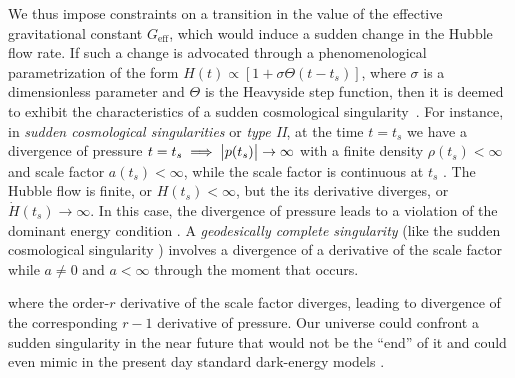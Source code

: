\documentclass[universe,article,accept,moreauthors,pdftex]{Definitions/mdpi}
\begin{document}
We thus impose constraints on a transition in the value of the effective gravitational constant $G_{\text{eff}}$, which would induce a sudden change in the Hubble flow rate. If such a change is advocated through a phenomenological parametrization of the form $H(t)\propto [1+\sigma \Theta(t-t_{s})]$, where $\sigma$ is a dimensionless parameter and $\Theta$ is the Heavyside step function, then it is deemed to exhibit the characteristics of a sudden cosmological \mbox{singularity \cite{Barrow_2004,Barrow:2004he,Fernandez-Jambrina:2006qld,Fernandez-Jambrina:2008pwx,Fernandez-Jambrina:2006tkb,Perivolaropoulos:2016nhp}}. For instance, in \textit{sudden cosmological singularities} or \textit{type II}, at the time $t=t_s$ we have a divergence of pressure $t=t_{s}\implies \big{|}p(t_{s})\big{|}\to \infty$ with a finite density $\rho(t_{s})<\infty$ and scale factor $a(t_{s})<\infty$, while the scale factor is continuous at $t_{s}$ \cite{Barrow_2004,Fernandez-Jambrina:2006qld,Fernandez-Jambrina:2006tkb,amendola_tsujikawa_2010}. The Hubble flow 
 is finite, or $H(t_{s})<\infty$, but the its derivative diverges, %
 or $\dot{H}(t_{s})\to \infty$. In this case, the divergence of pressure leads to a violation of the dominant energy condition \cite{Catto_n_2005}. A \textit{geodesically complete singularity} (like the sudden cosmological singularity \cite{Fernandez-Jambrina:2006qld,Fernandez-Jambrina:2006tkb,Perivolaropoulos:2016nhp}) involves a divergence of
a derivative of the scale factor while $a \neq 0$ and $ a<\infty$ through the moment that occurs. 

 where the order-$r$ derivative of the scale factor diverges, leading to divergence of the corresponding $r-1$ derivative of pressure. Our universe could confront a sudden singularity in the near future that would not be the ``end'' of it \cite{Denkiewicz_2012} and could even mimic in the present day standard dark-energy models \cite{Denkiewicz_2012}. 
\end{document}
